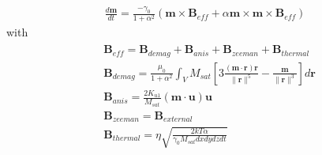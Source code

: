 \documentclass[12pt,fleqn]{article}
\begin{document}
\pagestyle{empty}

\begin{eqnarray*}
	\frac{d\mathbf{m}}{dt}=\frac{-\gamma_0}{1+\alpha^2}\left(\mathbf{m}\times\mathbf{B}_{eff}+\alpha\mathbf{m}\times\mathbf{m}\times\mathbf{B}_{eff}\right)
\end{eqnarray*}
with
\begin{eqnarray*}
	\begin{aligned}
&\mathbf{B}_{eff}=\mathbf{B}_{demag}+\mathbf{B}_{anis}+\mathbf{B}_{zeeman}+\mathbf{B}_{thermal}\\
&\mathbf{B}_{demag}=\frac{\mu_0}{1+\alpha^2}\int_V{M_{sat}\left[3\frac{\left(\mathbf{m}\cdot\mathbf{r}\right)\mathbf{r}}{\|\mathbf{r}\|^5}-\frac{\mathbf{m}}{\|\mathbf{r}\|^3}\right]}d\mathbf{r}\\
&\mathbf{B}_{anis}=\frac{2K_{u1}}{M_{sat}}\left(\mathbf{m}\cdot\mathbf{u}\right)\mathbf{u}\\
&\mathbf{B}_{zeeman}=\mathbf{B}_{external}\\
&\mathbf{B}_{thermal}=\eta\sqrt{\frac{2kT\alpha}{\gamma_0 M_{sat} dxdydzdt}}\\
\end{aligned}
\end{eqnarray*}
\end{document}
